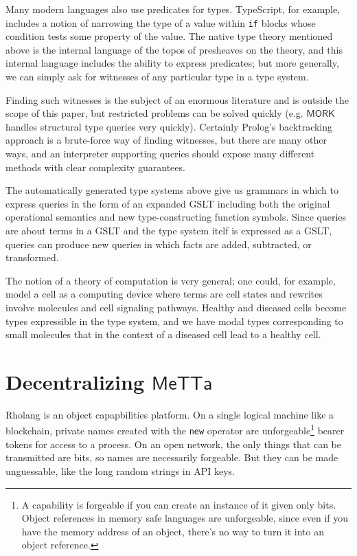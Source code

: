 \documentclass{article}
\begin{document}
Many modern languages also use predicates for types.  TypeScript, for example, includes a notion of narrowing the type of a value within \verb+if+ blocks whose condition tests some property of the value.  The native type theory mentioned above is the internal language of the topos of presheaves on the theory, and this internal language includes the ability to express predicates; but more generally, we can simply ask for witnesses of any particular type in a type system.  

Finding such witnesses is the subject of an enormous literature and is outside the scope of this paper, but restricted problems can be solved quickly (e.g. $\mathsf{MORK}$ handles structural type queries very quickly).  Certainly Prolog's backtracking approach is a brute-force way of finding witnesses, but there are many other ways, and an interpreter supporting queries should expose many different methods with clear complexity guarantees.

The automatically generated type systems above give us grammars in which to express queries in the form of an expanded GSLT including both the original operational semantics and new type-constructing function symbols. Since queries are about terms in a GSLT and the type system itelf is expressed as a GSLT, queries can produce new queries in which facts are added, subtracted, or transformed.

The notion of a theory of computation is very general; one could, for example, model a cell as a computing device where terms are cell states and rewrites involve molecules and cell signaling pathways.  Healthy and diseased cells become types expressible in the type system, and we have modal types corresponding to small molecules that in the context of a diseased cell lead to a healthy cell.

\section{Decentralizing $\mathsf{MeTTa}$}

Rholang is an object capapbilities platform.  On a single logical machine like a blockchain, private names created with the \verb+new+ operator are unforgeable\footnote{A capability is forgeable if you can create an instance of it given only bits. Object references in memory safe languages are unforgeable, since even if you have the memory address of an object, there's no way to turn it into an object reference.} bearer tokens for access to a process.  On an open network, the only things that can be transmitted are bits, so names are necessarily forgeable.  But they can be made unguessable, like the long random strings in API keys.
\end{document}
